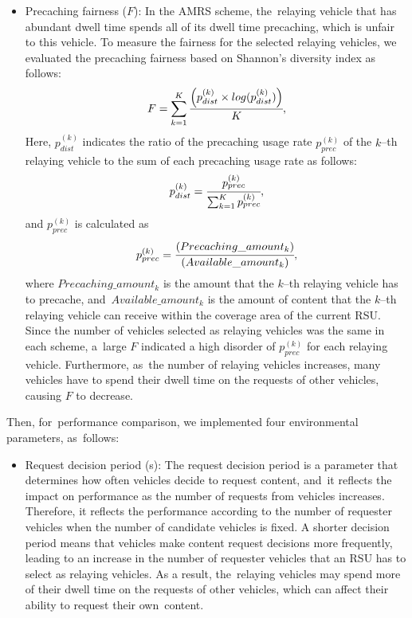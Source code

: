 \documentclass[sensors,aricle,accept,pdftex,moreauthors]{Definitions/mdpi}
\begin{document}
{\begin{itemize}
    \item Precaching fairness ($F$):
    In the AMRS scheme, the~relaying vehicle that has abundant dwell time spends all of its dwell time precaching, which is unfair to this vehicle.
    To measure the fairness for the selected relaying vehicles, we evaluated the precaching fairness based on Shannon's diversity index as follows:
\begin{equation}
        F = \sum_{k=1}^{K} \cfrac{\left( p^{(k)}_{dist} \times log(p^{(k)}_{dist}) \right)}{K},
    \end{equation}
    Here, $p^{(k)}_{dist}$ indicates the ratio of the precaching usage rate $p^{(k)}_{prec}$ of the $k$--th relaying vehicle to the sum of each precaching usage rate as follows:
\begin{equation}
        p^{(k)}_{dist} = \cfrac{p^{(k)}_{prec}}{\sum_{k=1}^{K} p^{(k)}_{prec}},
    \end{equation}
    and $p^{(k)}_{prec}$ is calculated as
\begin{equation}
        p^{(k)}_{prec} = \cfrac{(Precaching\_amount_{k})}{(Available\_amount_{k})},
    \end{equation}
    where $Precaching\_amount_{k}$ is the amount that the $k$--th relaying vehicle has to precache, and~$Available\_amount_{k}$ is the amount of content that the $k$--th relaying vehicle can receive within the coverage area of the current RSU.
    Since the number of vehicles selected as relaying vehicles was the same in each scheme, a~large $F$ indicated a high disorder of $p^{(k)}_{prec}$ for each relaying vehicle.
    Furthermore, as~the number of relaying vehicles increases, many vehicles have to spend their dwell time on the requests of other vehicles, causing $F$ to decrease.
\end{itemize}

Then, for~performance comparison, we implemented four environmental parameters, as~follows:
\begin{itemize}
    \item Request decision period (s): 
    The request decision period is a parameter that determines how often vehicles decide to request content, and~it reflects the impact on performance as the number of requests from vehicles increases.
    Therefore, it reflects the performance according to the number of requester vehicles when the number of candidate vehicles is fixed.
    A shorter decision period means that vehicles make content request decisions more frequently, leading to an increase in the number of requester vehicles that an RSU has to select as relaying vehicles.
    As a result, the~relaying vehicles may spend more of their dwell time on the requests of other vehicles, which can affect their ability to request their own~content.
    

\end{itemize}}
\end{document}
